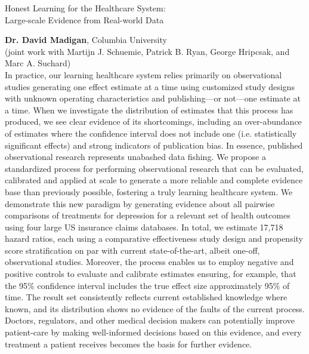 
\begin{center}
\Large Honest Learning for the Healthcare System: \\ Large-scale
Evidence from Real-world Data \\[1em]
\end{center}
\normalsize \textbf{Dr. David Madigan}, Columbia University \\[.75em]
\footnotesize(joint work with Martijn J. Schuemie, Patrick B. Ryan, George
Hripcsak, and Marc A. Suchard) \\[.5em]

\normalsize In practice, our learning healthcare system relies primarily on
observational studies generating one effect estimate at a time using
customized study designs with unknown operating characteristics and
publishing---or not---one estimate at a time. When we investigate
the distribution of estimates that this process has produced, we see
clear evidence of its shortcomings, including an over-abundance of
estimates where the confidence interval does not include one
(i.e. statistically significant effects) and strong indicators of
publication bias. In essence, published observational research
represents unabashed data fishing. We propose a standardized process
for performing observational research that can be evaluated,
calibrated and applied at scale to generate a more reliable and
complete evidence base than previously possible, fostering a truly
learning healthcare system. We demonstrate this new paradigm by
generating evidence about all pairwise comparisons of treatments for
depression for a relevant set of health outcomes using four large US
insurance claims databases. In total, we estimate 17,718 hazard
ratios, each using a comparative effectiveness study design and
propensity score stratification on par with current state-of-the-art,
albeit one-off, observational studies. Moreover, the process enables
us to employ negative and positive controls to evaluate and calibrate
estimates ensuring, for example, that the 95\% confidence interval
includes the true effect size approximately 95\% of time. The result
set consistently reflects current established knowledge where known,
and its distribution shows no evidence of the faults of the current
process. Doctors, regulators, and other medical decision makers can
potentially improve patient-care by making well-informed decisions
based on this evidence, and every treatment a patient receives becomes
the basis for further evidence.

\hrulefill

